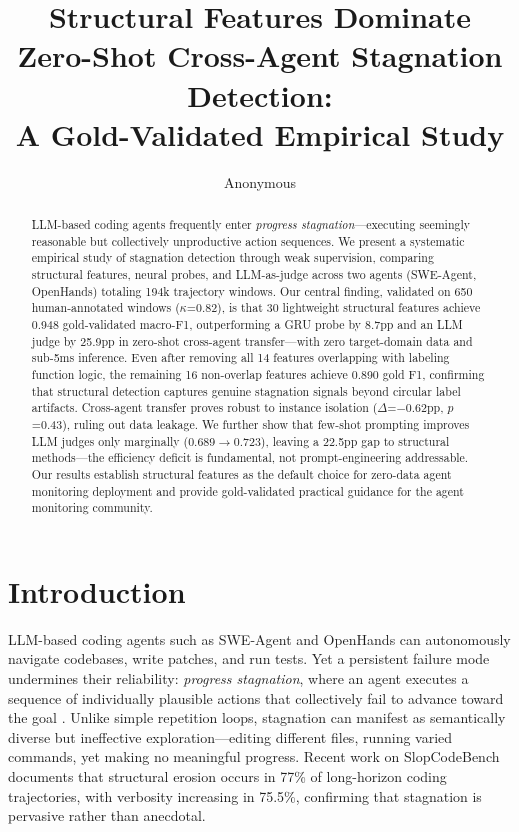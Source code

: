\documentclass[11pt,a4paper]{article}
\title{Structural Features Dominate Zero-Shot Cross-Agent Stagnation Detection: \\A Gold-Validated Empirical Study}
\author{Anonymous}
\begin{document}
\maketitle

\begin{abstract}
LLM-based coding agents frequently enter \emph{progress stagnation}---executing seemingly reasonable but collectively unproductive action sequences.
We present a systematic empirical study of stagnation detection through weak supervision, comparing structural features, neural probes, and LLM-as-judge across two agents (SWE-Agent, OpenHands) totaling 194k trajectory windows.
Our central finding, validated on 650 human-annotated windows ($\kappa$=0.82), is that 30 lightweight structural features achieve 0.948 gold-validated macro-F1, outperforming a GRU probe by 8.7pp and an LLM judge by 25.9pp in zero-shot cross-agent transfer---with zero target-domain data and sub-5ms inference.
Even after removing all 14 features overlapping with labeling function logic, the remaining 16 non-overlap features achieve 0.890 gold F1, confirming that structural detection captures genuine stagnation signals beyond circular label artifacts.
Cross-agent transfer proves robust to instance isolation ($\Delta$=$-$0.62pp, $p$=0.43), ruling out data leakage.
We further show that few-shot prompting improves LLM judges only marginally (0.689$\to$0.723), leaving a 22.5pp gap to structural methods---the efficiency deficit is fundamental, not prompt-engineering addressable.
Our results establish structural features as the default choice for zero-data agent monitoring deployment and provide gold-validated practical guidance for the agent monitoring community.
\end{abstract}

\section{Introduction}
\label{sec:intro}

LLM-based coding agents such as SWE-Agent \cite{yang2024swe} and OpenHands \cite{wang2024openhands} can autonomously navigate codebases, write patches, and run tests.
Yet a persistent failure mode undermines their reliability: \emph{progress stagnation}, where an agent executes a sequence of individually plausible actions that collectively fail to advance toward the goal \cite{jimenez2024swebench}.
Unlike simple repetition loops, stagnation can manifest as semantically diverse but ineffective exploration---editing different files, running varied commands, yet making no meaningful progress.
Recent work on SlopCodeBench \cite{slopcodebench2026} documents that structural erosion occurs in 77\% of long-horizon coding trajectories, with verbosity increasing in 75.5\%, confirming that stagnation is pervasive rather than anecdotal.
\end{document}
